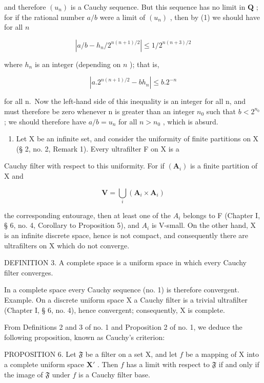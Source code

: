 and therefore \((u_{n})\) is a Cauchy sequence. But this sequence has no limit in \(\mathbf{Q}\) ; for if the rational number \(a / b\) were a limit of \((u_{n})\) , then by (1) we should have for all \(n\)

\[
\left| a / b - h _ {n} / 2 ^ {n (n + 1) / 2} \right| \leqslant 1 / 2 ^ {n (n + 3) / 2}
\]

where \(h_n\) is an integer (depending on \(n\) ); that is,

\[
\left| a. 2 ^ {n (n + 1) / 2} - b h _ {n} \right| \leqslant b. 2 ^ {- n}
\]

for all n.~Now the left-hand side of this inequality is an integer for all n, and must therefore be zero whenever n is greater than an integer \(n_{0}\) such that \(b < 2^{n_{0}}\) ; we should therefore have \(a/b = u_{n}\) for all \(n > n_{0}\) , which is absurd.

\begin{enumerate}
\def\labelenumi{\arabic{enumi})}
\setcounter{enumi}{1}
\tightlist
\item
  Let X be an infinite set, and consider the uniformity of finite partitions on X (§ 2, no. 2, Remark 1). Every ultrafilter F on X is a
\end{enumerate}

Cauchy filter with respect to this uniformity. For if \((\mathbf{A}_{i})\) is a finite partition of X and

\[
\mathbf {V} = \bigcup_ {i} (\mathbf {A} _ {i} \times \mathbf {A} _ {i})
\]

the corresponding entourage, then at least one of the \(A_{i}\) belongs to F (Chapter I, § 6, no. 4, Corollary to Proposition 5), and \(A_{i}\) is V-small. On the other hand, X is an infinite discrete space, hence is not compact, and consequently there are ultrafilters on X which do not converge.

DEFINITION 3. A complete space is a uniform space in which every Cauchy filter converges.

In a complete space every Cauchy sequence (no. 1) is therefore convergent. Example. On a discrete uniform space X a Cauchy filter is a trivial ultrafilter (Chapter I, § 6, no. 4), hence convergent; consequently, X is complete.

From Definitions 2 and 3 of no. 1 and Proposition 2 of no. 1, we deduce the following proposition, known as Cauchy's criterion:

PROPOSITION 6. Let \(\mathfrak{F}\) be a filter on a set X, and let \(f\) be a mapping of X into a complete uniform space \(\mathbf{X}'\) . Then \(f\) has a limit with respect to \(\mathfrak{F}\) if and only if the image of \(\mathfrak{F}\) under \(f\) is a Cauchy filter base.

